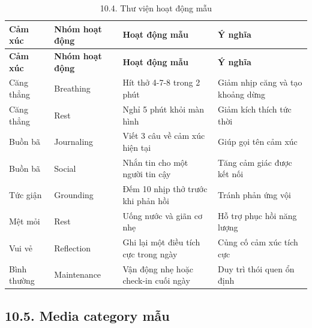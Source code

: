 \documentclass[12pt,a4paper]{article}
\begin{document}
\begin{center}
\scriptsize
\begin{longtable}{|P{0.18\textwidth}|P{0.25\textwidth}|P{0.25\textwidth}|P{0.22\textwidth}|}
\caption{10.4. Thư viện hoạt động mẫu}\\
\hline
\textbf{Cảm xúc} & \textbf{Nhóm hoạt động} & \textbf{Hoạt động mẫu} & \textbf{Ý nghĩa} \\
\hline
\endfirsthead
\hline
\textbf{Cảm xúc} & \textbf{Nhóm hoạt động} & \textbf{Hoạt động mẫu} & \textbf{Ý nghĩa} \\
\hline
\endhead
Căng thẳng & Breathing & Hít thở 4-7-8 trong 2 phút & Giảm nhịp căng và tạo khoảng dừng \\
\hline
Căng thẳng & Rest & Nghỉ 5 phút khỏi màn hình & Giảm kích thích tức thời \\
\hline
Buồn bã & Journaling & Viết 3 câu về cảm xúc hiện tại & Giúp gọi tên cảm xúc \\
\hline
Buồn bã & Social & Nhắn tin cho một người tin cậy & Tăng cảm giác được kết nối \\
\hline
Tức giận & Grounding & Đếm 10 nhịp thở trước khi phản hồi & Tránh phản ứng vội \\
\hline
Mệt mỏi & Rest & Uống nước và giãn cơ nhẹ & Hỗ trợ phục hồi năng lượng \\
\hline
Vui vẻ & Reflection & Ghi lại một điều tích cực trong ngày & Củng cố cảm xúc tích cực \\
\hline
Bình thường & Maintenance & Vận động nhẹ hoặc check-in cuối ngày & Duy trì thói quen ổn định \\
\hline
\end{longtable}
\normalsize
\end{center}

\subsection*{10.5. Media category mẫu}
\end{document}
